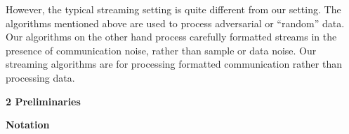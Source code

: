 However, the typical streaming setting is quite different from our setting. The algorithms mentioned above are used to process adversarial or “random” data. Our algorithms on the other hand process carefully formatted streams in the presence of communication noise, rather than sample or data noise. Our streaming algorithms are for processing formatted communication rather than processing data.\par







\par\medskip\noindent\textbf{
2 Preliminaries}\par




\par\medskip\noindent\textbf{Notation}\par




